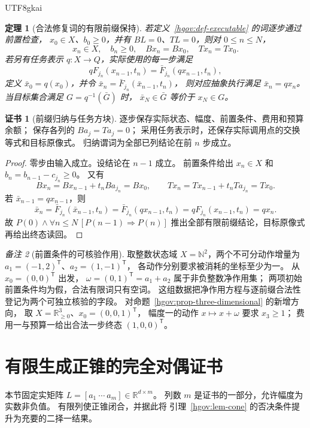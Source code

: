 \documentclass[12pt,a4paper,openany,notitlepage]{report}
\theoremstyle{plain}
\newtheorem{theorem}{定理}[chapter]
\theoremstyle{definition}
\newtheorem*{certificate}{证书}
\theoremstyle{remark}
\newtheorem{remark}[theorem]{备注}
\begin{document}
\begin{CJK*}{UTF8}{gkai}
\begin{theorem}[合法修复词的有限前缀保持]
\label{hgov:thm-execution}
若定义~\ref{hgov:def-executable} 的词逐步通过前置检查，
$x_0\in X$、$b_0\ge0$，并有 $BL=0$、$TL=0$，则对
$0\le n\le N$，
\[
 x_n\in X,\quad b_n\ge0,\quad
 Bx_n=Bx_0,\quad Tx_n=Tx_0.
\]
若另有任务表示 $q:X\to Q$，实际使用的每一步满足
\[
 qF_{j_n}(x_{n-1},t_n)
 =\bar F_{j_n}(qx_{n-1},t_n),
\]
定义 $\bar x_0=q(x_0)$，并令
$\bar x_n=\bar F_{j_n}(\bar x_{n-1},t_n)$，
则对应抽象执行满足 $\bar x_n=qx_n$。
当目标集合满足 $G=q^{-1}(\bar G)$ 时，
$\bar x_N\in\bar G$ 等价于 $x_N\in G$。
\end{theorem}
\begin{certificate}[前缀归纳与任务方块]
逐步保存实际状态、幅度、前置条件、费用和预算余额；
保存各列的 $Ba_j=Ta_j=0$；
采用任务表示时，还保存实际调用点的交换等式和目标原像式。
归纳谓词为全部已列结论在前 $n$ 步成立。
\end{certificate}
\begin{proof}
零步由输入成立。设结论在 $n-1$ 成立。
前置条件给出 $x_n\in X$ 和
$b_n=b_{n-1}-c_{j_n}\ge0$。
又有
\[
 Bx_n=Bx_{n-1}+t_nBa_{j_n}=Bx_0,\qquad
 Tx_n=Tx_{n-1}+t_nTa_{j_n}=Tx_0.
\]
若 $\bar x_{n-1}=qx_{n-1}$，则
\[
 \bar x_n=\bar F_{j_n}(\bar x_{n-1},t_n)
 =\bar F_{j_n}(qx_{n-1},t_n)
 =qF_{j_n}(x_{n-1},t_n)=qx_n.
\]
故 $P(0)\wedge\forall n\le N\,[P(n-1)\Rightarrow P(n)]$
推出全部有限前缀结论，目标原像式再给出终态读回。
\end{proof}

\begin{remark}[前置条件的可核验作用]
\label{hgov:rem-preconditions}
取整数状态域 $X=\mathbb N^2$，两个不可分动作增量为
$a_1=(-1,2)^{\mathsf T}$、$a_2=(1,-1)^{\mathsf T}$，
各动作分别要求被消耗的坐标至少为一。
从 $x_0=(0,0)^{\mathsf T}$ 出发，
$\omega=(0,1)^{\mathsf T}=a_1+a_2$ 属于非负整数净作用集；
两项初始前置条件均为假，合法有限词只有空词。
这组数据把净作用方程与逐前缀合法性登记为两个可独立核验的字段。
对命题~\ref{hgov:prop-three-dimensional} 的新增方向，
取 $X=\mathbb R_{\ge0}^3$、$x_0=(0,0,1)^{\mathsf T}$，
幅度一的动作 $x\mapsto x+\omega$ 要求 $x_3\ge1$；
费用一与预算一给出合法一步终态 $(1,0,0)^{\mathsf T}$。
\end{remark}

\section{有限生成正锥的完全对偶证书}
\label{exp:hom:cone-alternative}

本节固定实矩阵 $L=[a_1\ \cdots\ a_m]\in\mathbb R^{d\times m}$。
列数 $m$ 是证书的一部分，允许幅度为实数非负值。
有限列使正锥闭合，并据此将
引理~\ref{hgov:lem-cone} 的否决条件提升为充要的二择一结果。


\end{CJK*}
\end{document}
